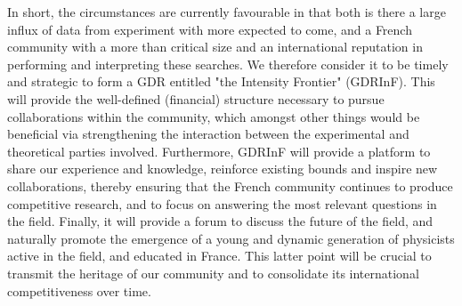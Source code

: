 In short, the circumstances are currently favourable in that both is there a large influx of data from experiment with more expected to come, and a French community with a more than critical size and an international reputation in performing and interpreting these searches. We therefore consider it to be timely and strategic to form a GDR entitled "the Intensity Frontier" (GDRInF). This  will provide the well-defined (financial) structure necessary to pursue collaborations within the community, which amongst other things would be beneficial via strengthening the interaction between the experimental and theoretical parties involved. Furthermore, GDRInF will provide a platform to share our experience and knowledge, reinforce existing bounds and inspire new collaborations, thereby ensuring that the French community continues to produce competitive research, and to focus on answering the most relevant questions in the field. Finally, it will provide a forum to discuss the future of the field, and naturally promote the emergence of a young and dynamic generation of physicists active in the field, and educated in France. This latter point will be crucial to transmit the heritage of our community and to consolidate its international competitiveness over time.

